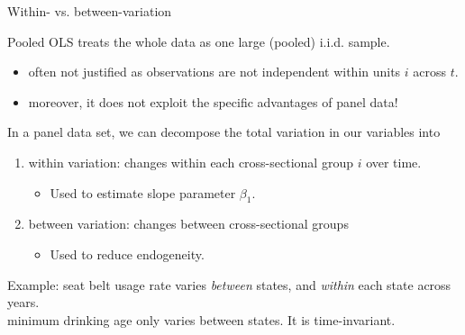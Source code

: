 \documentclass[9pt,aspectratio=169]{beamer}
\begin{document}
\begin{frame}{Within- vs. between-variation}

Pooled OLS treats the whole data as one large (pooled) i.i.d. sample.
\vspace{-0.23cm}
\begin{itemize}
    \item often not justified as observations are not independent within units $i$ across $t$.
    \item moreover, it does not exploit the specific advantages of panel data!
\end{itemize}
\bigskip
\pause    
In a panel data set, we can decompose the total variation in our variables into

\begin{enumerate}
    \item \alert{within variation:} changes within each cross-sectional group $i$ over time.
    \begin{itemize}
        \item[$\rightarrow$] Used to estimate slope parameter $\beta_1$. 
    \end{itemize}
     \item \alert{between variation:} changes between cross-sectional groups
     \begin{itemize}
        \item[$\rightarrow$] Used to reduce endogeneity. 
    \end{itemize} 
\end{enumerate}

Example: seat belt usage rate varies \textit{between} states, and \textit{within} each state across years. \\
minimum drinking age only varies between states. It is \alert{time-invariant}.
\end{frame}
\end{document}

